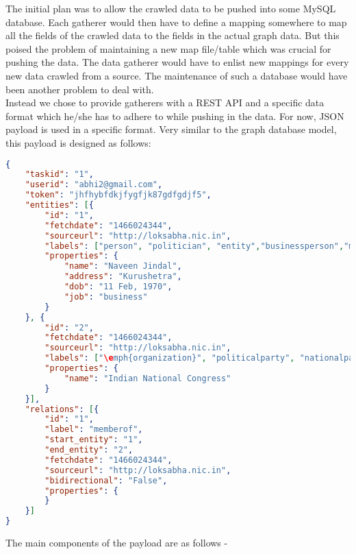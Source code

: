 The initial plan was to allow the crawled data to be pushed into some MySQL database. Each gatherer would then have to define a mapping somewhere to map all the fields of the crawled data to the fields in the actual graph data. But this poised the problem of maintaining a new map file/table which was crucial for pushing the data. The data gatherer would have to enlist new mappings for every new data crawled from a source. The maintenance of such a database would have been another problem to deal with. \\
%
Instead we chose to provide gatherers with a REST API and a specific data format which he/she has to adhere to while pushing in the data. For now, JSON payload is used in a specific format. Very similar to the graph database model, this payload is designed as follows:

\begin{lstlisting}[language=json,firstnumber=1]
{
    "taskid": "1",
    "userid": "abhi2@gmail.com",
    "token": "jhfhybfdkjfygfjk87gdfgdjf5",
    "entities": [{
        "id": "1",
        "fetchdate": "1466024344",
        "sourceurl": "http://loksabha.nic.in",
        "labels": ["person", "politician", "entity","businessperson","memberofParliament"],
        "properties": {
            "name": "Naveen Jindal",
            "address": "Kurushetra",
            "dob": "11 Feb, 1970",
            "job": "business"
        }
    }, {
        "id": "2",
        "fetchdate": "1466024344",
        "sourceurl": "http://loksabha.nic.in",
        "labels": ["\emph{organization}", "politicalparty", "nationalparty", "entity"],
        "properties": {
            "name": "Indian National Congress"
        }
    }],
    "relations": [{
        "id": "1",
        "label": "memberof",
        "start_entity": "1",
        "end_entity": "2",
        "fetchdate": "1466024344",
        "sourceurl": "http://loksabha.nic.in",
        "bidirectional": "False",
        "properties": {
        }
    }]
}
\end{lstlisting}

The main components of the payload are as follows -

